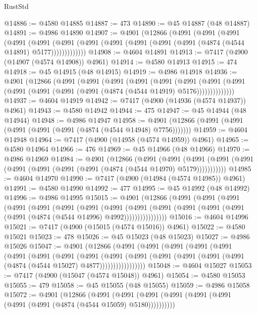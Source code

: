 \begin{lexlean}{RustStd}
\begin{coremodule}
@14886 := @4580 @14885
@14887 := 473
@14890 := @45 @14887 (@48 @14887)
@14891 := @4986 @14890
@14907 := @4901
    (@12866
      (@4991
        (@4991
          (@4991
            (@4991
              (@4991
                (@4991 (@4991 (@4991 (@4991 (@4991 (@4991 (@4874 (@4544 @14891) @5177)))))))))))))
@14908 := @4604 @14891
@14913 := @7417 (@4900 (@14907 (@4574 @14908)) @4961)
@14914 := @4580 @14913
@14915 := 474
@14918 := @45 @14915 (@48 @14915)
@14919 := @4986 @14918
@14936 := @4901
    (@12866
      (@4991
        (@4991
          (@4991
            (@4991
              (@4991
                (@4991
                  (@4991
                    (@4991 (@4991 (@4991 (@4991 (@4991 (@4874 (@4544 @14919) @5176))))))))))))))
@14937 := @4604 @14919
@14942 := @7417 (@4900 (@14936 (@4574 @14937)) @4961)
@14943 := @4580 @14942
@14944 := 475
@14947 := @45 @14944 (@48 @14944)
@14948 := @4986 @14947
@14958 := @4901 (@12866 (@4991 (@4991 (@4991 (@4991 (@4991 (@4874 (@4544 @14948) @7756)))))))
@14959 := @4604 @14948
@14964 := @7417 (@4900 (@14958 (@4574 @14959)) @4961)
@14965 := @4580 @14964
@14966 := 476
@14969 := @45 @14966 (@48 @14966)
@14970 := @4986 @14969
@14984 := @4901
    (@12866
      (@4991
        (@4991
          (@4991 (@4991 (@4991 (@4991 (@4991 (@4991 (@4991 (@4874 (@4544 @14970) @5179)))))))))))
@14985 := @4604 @14970
@14990 := @7417 (@4900 (@14984 (@4574 @14985)) @4961)
@14991 := @4580 @14990
@14992 := 477
@14995 := @45 @14992 (@48 @14992)
@14996 := @4986 @14995
@15015 := @4901
    (@12866
      (@4991
        (@4991
          (@4991
            (@4991
              (@4991
                (@4991
                  (@4991
                    (@4991
                      (@4991
                        (@4991
                          (@4991 (@4991 (@4991 (@4991 (@4874 (@4544 @14996) @4992))))))))))))))))
@15016 := @4604 @14996
@15021 := @7417 (@4900 (@15015 (@4574 @15016)) @4961)
@15022 := @4580 @15021
@15023 := 478
@15026 := @45 @15023 (@48 @15023)
@15027 := @4986 @15026
@15047 := @4901
    (@12866
      (@4991
        (@4991
          (@4991
            (@4991
              (@4991
                (@4991
                  (@4991
                    (@4991
                      (@4991
                        (@4991
                          (@4991
                            (@4991 (@4991 (@4991 (@4991 (@4874 (@4544 @15027) @4877)))))))))))))))))
@15048 := @4604 @15027
@15053 := @7417 (@4900 (@15047 (@4574 @15048)) @4961)
@15054 := @4580 @15053
@15055 := 479
@15058 := @45 @15055 (@48 @15055)
@15059 := @4986 @15058
@15072 := @4901
    (@12866
      (@4991 (@4991 (@4991 (@4991 (@4991 (@4991 (@4991 (@4991 (@4874 (@4544 @15059) @5180))))))))))

\end{coremodule}
\end{lexlean}
